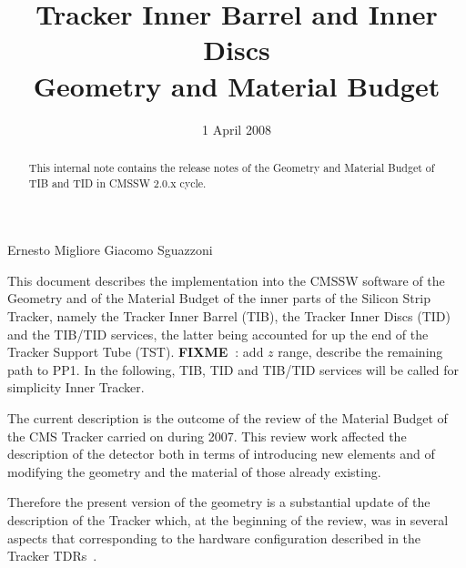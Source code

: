 \documentclass{cmspaper}
\begin{document}
\def \mrad      {{\rm \, mrad}}
\newcommand {\cm}         {\rm   cm}
\newcommand {\mm}         {\rm   mm}
\newcommand {\m}          {\rm   m}

\renewcommand{\labelenumi}{\alph{enumi})}
\newcommand{\fixme}{{\bf FIXME~}}



\begin{titlepage}

   \date{1 April 2008}

  \title{Tracker Inner Barrel and Inner Discs\\
  Geometry and Material Budget}

  \begin{Authlist}
    Ernesto Migliore
    Giacomo Sguazzoni
  \end{Authlist}

 
  \begin{abstract}
This internal note contains the release notes of the Geometry and
Material Budget of TIB and TID in CMSSW 2.0.x cycle. 
  \end{abstract} 

\end{titlepage}

\setcounter{page}{2}%

This document describes the implementation into the CMSSW software of
the Geometry and of the Material Budget of the inner parts of the
Silicon Strip Tracker, namely the Tracker Inner Barrel (TIB), the
Tracker Inner Discs (TID) and the TIB/TID services, the
latter being accounted for up the end of the Tracker Support Tube (TST).
\fixme: add $z$ range, describe the remaining path to PP1.
In the following, TIB, TID and TIB/TID services will be called for
simplicity Inner Tracker.

The current description is the outcome of the review of the Material
Budget of the CMS Tracker carried on during 2007. This review work
affected the description of the detector both in terms of introducing
new elements and of modifying the geometry and the material of those
already existing.

Therefore the present version of the geometry is a substantial update of the description
of the Tracker which, at the beginning of the review, was in several
aspects that corresponding to the hardware configuration described in the Tracker TDRs~\cite{tdr}.
\end{document}
